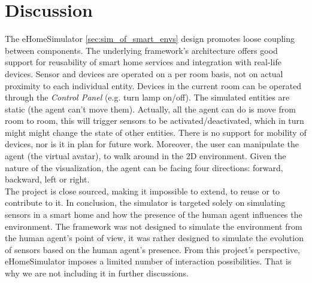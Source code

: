 \section{Discussion}\label{sec:discussions}



The eHomeSimulator \ref{sec:sim_of_smart_envs} design promotes loose coupling between components. The underlying framework's architecture offers good support for reusability of smart home services and integration with real-life devices. Sensor and devices are operated on a per room basis, not on actual proximity to each individual entity. Devices in the current room can be operated through the \emph{Control Panel} (e.g. turn lamp on/off). The simulated entities are static (the agent can't move them). Actually, all the agent can do is move from room to room, this will trigger sensors to be activated/deactivated, which in turn might might change the state of other entities. There is no support for mobility of devices, nor is it in plan for future work. Moreover, the user can manipulate the agent (the virtual avatar), to walk around in the 2D environment. Given the nature of the visualization, the agent can be facing four directions: forward, backward, left or right.\\

The project is close sourced, making it impossible to extend, to reuse or to contribute to it. In conclusion, the simulator is targeted solely on simulating sensors in a smart home and how the presence of the human agent influences the environment. The framework was not designed to simulate the environment from the human agent's point of view, it was rather designed to simulate the evolution of sensors based on the human agent's presence. From this project's perspective, eHomeSimulator imposes a limited number of interaction possibilities. That is why we are not including it in further discussions.\\

